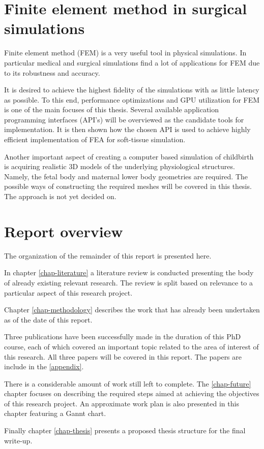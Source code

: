 \section{Finite element method in surgical simulations}

Finite element method (FEM) is a very useful tool in physical simulations. In particular medical and surgical simulations find a lot of applications for FEM due to its robustness and accuracy.

It is desired to achieve the highest fidelity of the simulations with as little latency as possible. To this end, performance optimizations and GPU utilization for FEM is one of the main focuses of this thesis. Several available application programming interfaces (API's) will be overviewed as the candidate tools for implementation. It is then shown how the chosen API is used to achieve highly efficient implementation of FEA for soft-tissue simulation.

Another important aspect of creating a computer based simulation of childbirth is acquiring realistic 3D models of the underlying physiological structures. Namely, the fetal body and maternal lower body geometries are required. The possible ways of constructing the required meshes will be covered in this thesis. The approach is not yet decided on.

\section{Report overview}

The organization of the remainder of this report is presented here.

In chapter \ref{chap-literature} a literature review is conducted  presenting the body of already existing relevant research. The review is split based on relevance to a particular aspect of this research project.

Chapter \ref{chap-methodology} describes the work that has already been undertaken as of the date of this report.

Three publications have been successfully made in the duration of this PhD course, each of which covered an important topic related to the area of interest of this research. All three papers will be covered in this report. The papers are include in the \ref{appendix}.

There is a considerable amount of work still left to complete. The \ref{chap-future} chapter focuses on describing the required steps aimed at achieving the objectives of this research project. An approximate work plan is also presented in this chapter featuring a Gannt chart.

Finally chapter \ref{chap-thesis} presents a proposed thesis structure for the final write-up.
